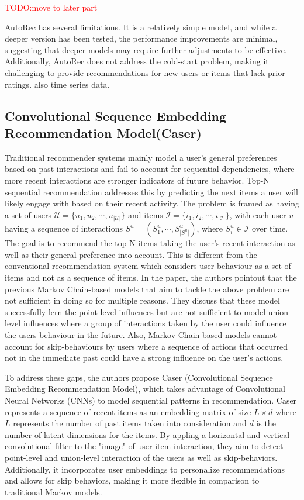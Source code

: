 \documentclass{ieeetj}
\begin{document}
\textcolor{red}{TODO:move to later part}

AutoRec has several limitations. It is a relatively simple model, and while a deeper version has been tested, the performance improvements are minimal, suggesting that deeper models may require further adjustments to be effective. Additionally, AutoRec does not address the cold-start problem, making it challenging to provide recommendations for new users or items that lack prior ratings. also time series data.

\subsection{Convolutional Sequence Embedding Recommendation Model(Caser)\cite{tang2018personalized}}
Traditional recommender systems mainly model a user's general preferences based on past interactions and fail to account for sequential dependencies, where more recent interactions are stronger indicators of future behavior. Top-N sequential recommendation addresses this by predicting the next items a user will likely engage with based on their recent activity. The problem is framed as having a set of users $\mathcal{U} = \{u_1, u_2, \cdots, u_{|\mathcal{U}|}\}$ and items $\mathcal{I} = \{i_1, i_2, \cdots, i_{|\mathcal{I}|}\}$, with each user $u$ having a sequence of interactions $S^u = (S_1^u, \cdots, S_{|S^u|}^u)$, where $S_i^u \in \mathcal{I}$ over time. The goal is to recommend the top N items taking the user's recent interaction as well as their general preference into account. This is different from the conventional recommendation system which considers user behaviour as a set of items and not as a sequence of items.
In the paper, the authors pointout that the previous Markov Chain-based models that aim to tackle the above problem are not sufficient in doing so for multiple reasons. They discuss that these model successfully lern the point-level influences but are not sufficient to model union-level influences where a group of interactions taken by the user could influence the users behaviour in the future. Also, Markov-Chain-based models cannot account for skip-behaviours by users where a sequence of actions that occurred not in the immediate past could have a strong influence on the user's actions. 

To address these gaps, the authors propose Caser (Convolutional Sequence Embedding Recommendation Model), which takes advantage of Convolutional Neural Networks (CNNs) to model sequential patterns in recommendation. Caser represents a sequence of recent items as an embedding matrix of size $L\times d$ where $L$ represents the number of past items taken into consideration and $d$ is the number of latent dimensions for the items. By appling a horizontal and vertical convolutional filter to the "image" of user-item interaction, they aim to detect point-level and union-level interaction of the users as well as skip-behaviors. Additionally, it incorporates user embeddings to personalize recommendations and allows for skip behaviors, making it more flexible in comparison to traditional Markov models.
\end{document}
